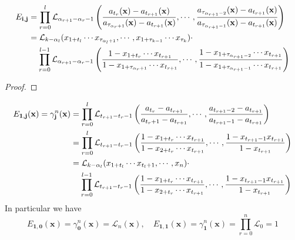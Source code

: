 \documentclass[main]{subfiles}
\begin{document}
\begin{proposition}
\begin{align*}
E_{\mathbf i,\mathbf j}&=\prod_{r=0}^l\mathcal L_{\alpha_{r+1}-\alpha_r-1}\left(\frac{a_{t_r}(\mathbf x)-a_{t_{r+1}}(\mathbf x)}{a_{\tau_{\alpha_r+1}}(\mathbf x)-a_{t_{r+1}}(\mathbf x)},\cdots,\frac{a_{\tau_{\alpha_{r+1}-2}}(\mathbf x)-a_{t_{r+1}}(\mathbf x)}{a_{\tau_{\alpha_{r+1}-1}}(\mathbf x)-a_{t_{r+1}}(\mathbf x)}\right) \\
&=\mathcal L_{k-\alpha_l}(x_{1+t_l}\cdots x_{\tau_{\alpha_l+1}},\cdots,x_{1+\tau_{k-1}}\cdots x_{\tau_k})\cdot \\
&\mkern20mu 
\prod_{r=0}^{l-1}\mathcal L_{\alpha_{r+1}-\alpha_r-1}\left(
\frac{	1-x_{1+t_r}\cdots x_{t_{r+1}}	}{	1-x_{1+\tau_{\alpha_r+1}}\cdots x_{t_{r+1}}	}
,\cdots,
\frac{	1-x_{1+\tau_{\alpha_{r+1}-2}}\cdots x_{t_{r+1}}	}{	1-x_{1+\tau_{\alpha_{r+1}-1}}\cdots x_{t_{r+1}}	}
\right)
\end{align*}
\end{proposition}

\begin{proof}

\end{proof}

\begin{example}
\begin{align*}
E_{\mathbf1,\mathbf j}(\mathbf x)=\gamma^n_{\mathbf j}(\mathbf x)&=\prod_{r=0}^l\mathcal L_{t_{r+1}-t_r-1}\left(
\frac{	a_{t_r}-a_{t_{r+1}}	}{	a_{t_r+1}-a_{t_{r+1}}	}	,\cdots,	\frac{	a_{t_{r+1}-2}-a_{t_{r+1}} }{	a_{t_{r+1}-1}-a_{t_{r+1}}	}
\right) \\
&=\prod_{r=0}^l\mathcal L_{t_{r+1}-t_r-1}\left(
\frac{1-x_{1+t_r}\cdots x_{t_{r+1}}}{1-x_{2+t_r}\cdots x_{t_{r+1}}}		,\cdots,	\frac{1-x_{t_{r+1}-1}x_{t_{r+1}}}{1-x_{t_{r+1}}}
\right) \\
&=\mathcal L_{k-\alpha_l}(x_{1+t_l}\cdots x_{t_l+1},\cdots,x_n)\cdot \\
&\mkern20mu \prod_{r=0}^{l-1}\mathcal L_{t_{r+1}-t_r-1}\left(
\frac{1-x_{1+t_r}\cdots x_{t_{r+1}}}{1-x_{2+t_r}\cdots x_{t_{r+1}}}		,\cdots,	\frac{1-x_{t_{r+1}-1}x_{t_{r+1}}}{1-x_{t_{r+1}}}
\right)
\end{align*}
In particular we have
\[E_{\mathbf1,\mathbf0}(\mathbf x)=\gamma^n_{\mathbf 0}(\mathbf x)=\mathcal L_n(\mathbf x),\quad E_{\mathbf1,\mathbf1}(\mathbf x)=\gamma^n_{\mathbf 1}(\mathbf x)=\prod_{r=0}^n\mathcal L_{0}=1\]
\end{example}
\end{document}
